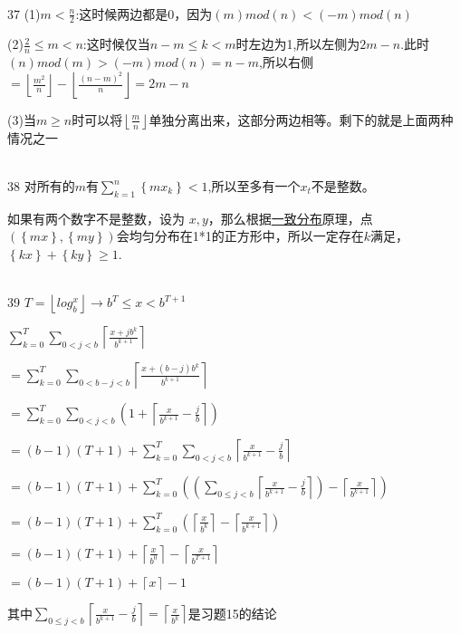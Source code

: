\documentclass[onecolumn]{article}
\begin{document}
~\\
37 (1)$m<\frac{n}{2}$:这时候两边都是0，因为$(m)mod(n)<(-m)mod(n)$ \par
(2)$\frac{2}{n}\leq m < n$:这时候仅当$n-m\leq k < m$时左边为1,所以左侧为$2m-n$.此时$(n)mod(m)>(-m)mod(n)=n-m$,所以右侧 $=\left \lfloor \frac{m^{2}}{n} \right \rfloor-\left \lfloor \frac{(n-m)^{2}}{n} \right \rfloor=2m-n$\par
(3)当$m\geq n$时可以将$\left \lfloor \frac{m}{n} \right \rfloor$单独分离出来，这部分两边相等。剩下的就是上面两种情况之一\par
~\\
38 对所有的$m$有$\sum_{k=1}^{n}\left \{ mx_{k} \right \}<1$,所以至多有一个$x_{t}$不是整数。\par
如果有两个数字不是整数，设为 $x,y$，那么根据\href{https://baike.baidu.com/item/%E4%B8%80%E8%87%B4%E5%88%86%E5%B8%83/12572054?fr=aladdin}{一致分布}原理，点$(\left \{ mx \right \},\left \{ my \right \})$会均匀分布在1*1的正方形中，所以一定存在$k$满足，$\left \{ kx \right \}+\left \{ ky \right \}\geq 1$. \par
~\\
39 $T=\left \lfloor log_{b}^{x} \right \rfloor\rightarrow b^{T}\leq x<b^{T+1}$ \par
$\sum_{k=0}^{T}\sum_{0<j<b}\left \lceil \frac{x+jb^{k}}{b^{k+1}} \right \rceil$ \par
$=\sum_{k=0}^{T}\sum_{0<b-j<b}\left \lceil \frac{x+(b-j)b^{k}}{b^{k+1}} \right \rceil$ \par
$=\sum_{k=0}^{T}\sum_{0<j<b}\left (1+\left \lceil \frac{x}{b^{k+1}}-\frac{j}{b} \right \rceil \right )$ \par
$=(b-1)(T+1)+\sum_{k=0}^{T}\sum_{0<j<b} \left \lceil \frac{x}{b^{k+1}}-\frac{j}{b} \right \rceil $ \par
$=(b-1)(T+1)+\sum_{k=0}^{T}\left ( \left (\sum_{0\leq j<b} \left \lceil \frac{x}{b^{k+1}}-\frac{j}{b} \right \rceil \right ) -\left \lceil \frac{x}{b^{k+1}} \right \rceil \right ) $\par
$=(b-1)(T+1)+\sum_{k=0}^{T}\left ( \left \lceil \frac{x}{b^{k}} \right \rceil -\left \lceil \frac{x}{b^{k+1}} \right \rceil \right )$\par
$ =(b-1)(T+1)+\left \lceil \frac{x}{b^{0}} \right \rceil-\left \lceil \frac{x}{b^{T+1}} \right \rceil$\par
$=(b-1)(T+1)+\left \lceil x \right \rceil-1$ \par
其中$\sum_{0\leq j<b} \left \lceil \frac{x}{b^{k+1}}-\frac{j}{b} \right \rceil =\left \lceil \frac{x}{b^{k}} \right \rceil$是习题15的结论\par
\end{document}
